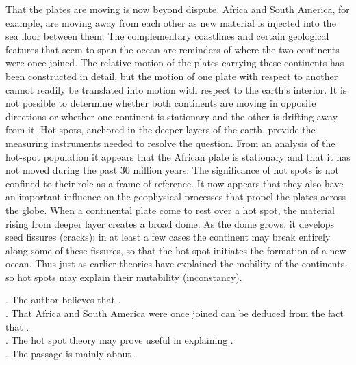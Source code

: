 That the plates are moving is now beyond dispute. Africa and South America, for example, are moving away from each other as new material is injected into the sea floor between them. The complementary coastlines and certain geological features that seem to span the ocean are reminders of where the two continents were once joined. The relative motion of the plates carrying these continents has been constructed in detail, but the motion of one plate with respect to another cannot readily be translated into motion with respect to the earth’s interior. It is not possible to determine whether both continents are moving in opposite directions or whether one continent is stationary and the other is drifting away from it. Hot spots, anchored in the deeper layers of the earth, provide the measuring instruments needed to resolve the question. From an analysis of the hot-spot population it appears that the African plate is stationary and that it has not moved during the past 30 million years.
The significance of hot spots is not confined to their role as a frame of reference. It now appears that they also have an important influence on the geophysical processes that propel the plates across the globe. When a continental plate come to rest over a hot spot, the material rising from deeper layer creates a broad dome. As the dome grows, it develops seed fissures (cracks); in at least a few cases the continent may break entirely along some of these fissures, so that the hot spot initiates the formation of a new ocean. Thus just as earlier theories have explained the mobility of the continents, so hot spots may explain their mutability (inconstancy).
\begin{questions}    .	The author believes that \ltk{}.\\
    .	That Africa and South America were once joined can be deduced from the fact that \ltk{}.\\
    .	The hot spot theory may prove useful in explaining \ltk{}.\\
    .	The passage is mainly about \ltk{}.\\
\end{questions} 

